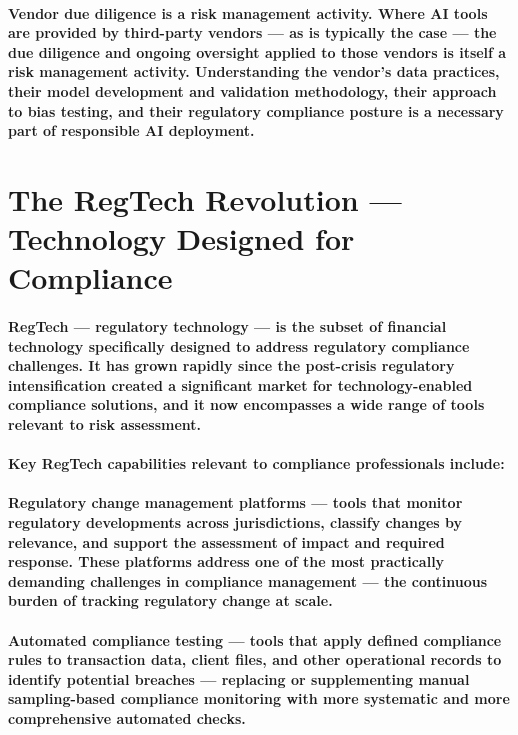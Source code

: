 \paragraph{\textbf{Vendor due diligence is a risk management activity}. Where AI tools are provided by third-party vendors — as is typically the case — the due diligence and ongoing oversight applied to those vendors is itself a risk management activity. Understanding the vendor's data practices, their model development and validation methodology, their approach to bias testing, and their regulatory compliance posture is a necessary part of responsible AI deployment.}

\section{The RegTech Revolution — Technology Designed for Compliance}
\paragraph{\textbf{RegTech} — regulatory technology — is the subset of financial technology specifically designed to address regulatory compliance challenges. It has grown rapidly since the post-crisis regulatory intensification created a significant market for technology-enabled compliance solutions, and it now encompasses a wide range of tools relevant to risk assessment.}
\paragraph{Key RegTech capabilities relevant to compliance professionals include:}
\paragraph{\textbf{Regulatory change management platforms} — tools that monitor regulatory developments across jurisdictions, classify changes by relevance, and support the assessment of impact and required response. These platforms address one of the most practically demanding challenges in compliance management — the continuous burden of tracking regulatory change at scale.}
\paragraph{\textbf{Automated compliance testing} — tools that apply defined compliance rules to transaction data, client files, and other operational records to identify potential breaches — replacing or supplementing manual sampling-based compliance monitoring with more systematic and more comprehensive automated checks.}
